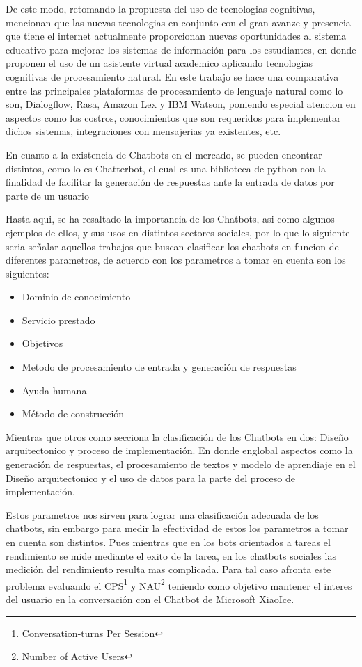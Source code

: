 De este modo, retomando la propuesta del uso de tecnologias cognitivas, \citet{asistVirAcad} mencionan que las nuevas tecnologias en conjunto con el gran avanze y presencia que tiene el internet actualmente proporcionan nuevas oportunidades al sistema educativo para mejorar los sistemas de información para los estudiantes, en donde proponen el uso de un asistente virtual academico aplicando tecnologias cognitivas de procesamiento natural. En este trabajo se hace una comparativa entre las principales plataformas de procesamiento de lenguaje natural como lo son, Dialogflow, Rasa, Amazon Lex y IBM Watson, poniendo especial atencion en aspectos como los costros, conocimientos que son requeridos para implementar dichos sistemas, integraciones con mensajerias ya existentes, etc.

En cuanto a la existencia de Chatbots en el mercado, se pueden encontrar distintos, como lo es Chatterbot, el cual es una biblioteca de python con la finalidad de facilitar la generación de respuestas ante la entrada de datos por parte de un usuario\cite{chatterbot}

Hasta aqui, se ha resaltado la importancia de los Chatbots, asi como algunos ejemplos de ellos, y sus usos en distintos sectores sociales, por lo que lo siguiente seria señalar aquellos trabajos que buscan clasificar los chatbots en funcion de diferentes parametros, de acuerdo con \citet{adamopoulou2020overview} los parametros a tomar en cuenta son los siguientes:

\begin{itemize} 
	\item Dominio de conocimiento
	\item Servicio prestado
	\item Objetivos
	\item Metodo de procesamiento de entrada y generación de respuestas
	\item Ayuda humana
	\item Método de construcción
\end{itemize}

Mientras que otros como \citet{lokman2018modern} secciona la clasificación de los Chatbots en dos: Diseño arquitectonico y proceso de implementación. En donde englobal aspectos como la generación de respuestas, el procesamiento de textos y modelo de aprendiaje en el Diseño arquitectonico y el uso de datos para la parte del proceso de implementación.

Estos parametros nos sirven para lograr una clasificación adecuada de los chatbots, sin embargo para medir la efectividad de estos los parametros a tomar en cuenta son distintos. Pues mientras que en los bots orientados a tareas el rendimiento se mide mediante el exito de la tarea, en los chatbots sociales las medición del rendimiento resulta mas complicada\citep{shawar2007different}. Para tal caso \citet{zhou2020design} afronta este problema evaluando el CPS\footnote{Conversation-turns Per Session} y NAU\footnote{Number of Active Users} teniendo como objetivo mantener el interes del usuario en la conversación con el Chatbot de Microsoft XiaoIce.

